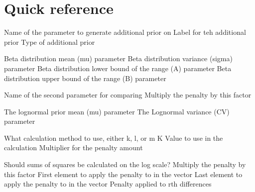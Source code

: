 \section{Quick reference\label{sec:quick-reference}}
\par
{} {Name of the parameter to generate additional prior on}
 {Label for teh additional prior}
 {Type of additional prior}
\par\textbf{}\par
{} {Beta distribution mean (mu) parameter}
 {Beta distribution variance (sigma) parameter}
 {Beta distribution lower bound of the range (A) parameter}
 {Beta distribution upper bound of the range (B) parameter}
\par\textbf{}\par
{} {Name of the second parameter for comparing}
 {Multiply the penalty by this factor}
\par\textbf{}\par
{} {The lognormal prior mean (mu) parameter}
 {The Lognormal variance (CV) parameter}
\par\textbf{}\par
\par\textbf{}\par
{} {What calculation method to use, either k, l, or m}
 {K Value to use in the calculation}
 {Multiplier for the penalty amount}
\par\textbf{}\par
{} {Should sums of squares be calculated on the log scale?}
 {Multiply the penalty by this factor}
 {First element to apply the penalty to in the vector}
 {Last element to apply the penalty to in the vector}
 {Penalty applied to rth differences}
\par\par

